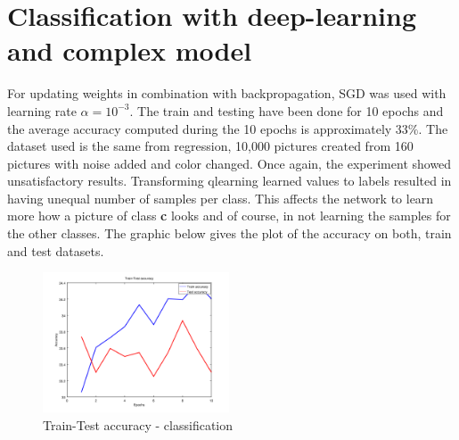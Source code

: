 \section{Classification with deep-learning and complex model}

For updating weights in combination with backpropagation, SGD was used with learning rate $\alpha = 10^{-3}$. The train and testing have been done for 10 epochs and the average accuracy computed during the 10 epochs is approximately $33\%$. The dataset used is the same from regression, 10,000 pictures created from 160 pictures with noise added and color changed. Once again, the experiment showed unsatisfactory results. Transforming qlearning learned values to labels resulted in having unequal number of samples per class. This affects the network to learn more how a picture of class \textbf{c} looks and of course, in not learning the samples for the other classes. The graphic below gives the plot of the accuracy on both, train and test datasets.

\begin{figure}[h]
	\begin{center}
		\includegraphics[width=209px,height=157px]{src/img/results/train-test-classif}
		\caption{Train-Test accuracy - classification} \label{fig:100tt}
    \end{center}
\end{figure}


